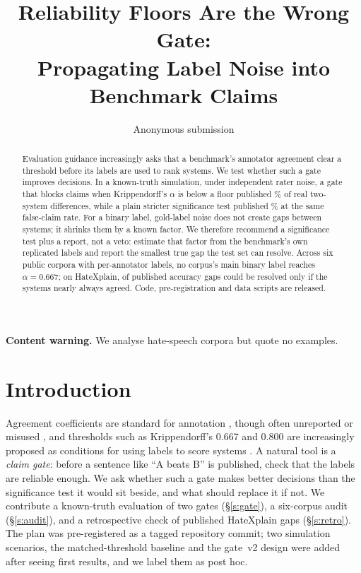 \documentclass[11pt]{article}
\title{Reliability Floors Are the Wrong Gate:\\Propagating Label Noise into Benchmark Claims}
\author{Anonymous submission}
\begin{document}
\maketitle
\begin{abstract}
Evaluation guidance increasingly asks that a benchmark's annotator agreement clear a threshold before its labels are used to rank systems. We test whether such a gate improves decisions. In a known-truth simulation, under independent rater noise, a gate that blocks claims when Krippendorff's $\alpha$ is below a floor published \simResVoneIid\% of real two-system differences, while a plain stricter significance test published \simResMatchedIid\% at the same false-claim rate. For a binary label, gold-label noise does not create gaps between systems; it shrinks them by a known factor. We therefore recommend a significance test plus a report, not a veto: estimate that factor from the benchmark's own replicated labels and report the smallest true gap the test set can resolve. Across six public corpora with per-annotator labels, no corpus's main binary label reaches $\alpha=0.667$; on HateXplain, \retroUnresolvable of \retroPairs published accuracy gaps could be resolved only if the systems nearly always agreed. Code, pre-registration and data scripts are released.
\end{abstract}

\noindent\textbf{Content warning.} We analyse hate-speech corpora but quote no examples.

\section{Introduction}
Agreement coefficients are standard for annotation \citep{artstein2008survey}, though often unreported or misused \citep{klie2024analyzing}, and thresholds such as Krippendorff's 0.667 and 0.800 \citep{krippendorff2004reliability} are increasingly proposed as conditions for using labels to score systems \citep{caban2026measurement}. A natural tool is a \emph{claim gate}: before a sentence like ``A beats B'' is published, check that the labels are reliable enough. We ask whether such a gate makes better decisions than the significance test it would sit beside, and what should replace it if not. We contribute a known-truth evaluation of two gates (\S\ref{s:gate}), a six-corpus audit (\S\ref{s:audit}), and a retrospective check of published HateXplain gaps (\S\ref{s:retro}). The plan was pre-registered as a tagged repository commit; two simulation scenarios, the matched-threshold baseline and the gate~v2 design were added after seeing first results, and we label them as post hoc.
\end{document}
